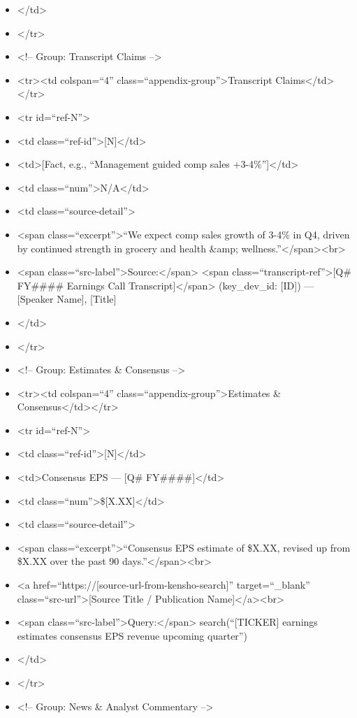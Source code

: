 \documentclass[11pt]{article}
\begin{document}
\begin{itemize}[leftmargin=*,itemsep=2pt,topsep=2pt]
\item {} </td>
\item {} </tr>
\item {} <!-- Group: Transcript Claims -->
\item {} <tr><td colspan=``4'' class=``appendix-group''>Transcript Claims</td></tr>
\item {} <tr id=``ref-N''>
\item {} <td class=``ref-id''>[N]</td>
\item {} <td>[Fact, e.g., ``Management guided comp sales +3-4\%'']</td>
\item {} <td class=``num''>N/A</td>
\item {} <td class=``source-detail''>
\item {} <span class=``excerpt''>``We expect comp sales growth of 3-4\% in Q4, driven by continued strength in grocery and health \&amp; wellness.''</span><br>
\item {} <span class=``src-label''>Source:</span> <span class=``transcript-ref''>[Q\# FY\#\#\#\# Earnings Call Transcript]</span> (key\_\allowbreak{}dev\_\allowbreak{}id: [ID]) — [Speaker Name], [Title]
\item {} </td>
\item {} </tr>
\item {} <!-- Group: Estimates \& Consensus -->
\item {} <tr><td colspan=``4'' class=``appendix-group''>Estimates \& Consensus</td></tr>
\item {} <tr id=``ref-N''>
\item {} <td class=``ref-id''>[N]</td>
\item {} <td>Consensus EPS — [Q\# FY\#\#\#\#]</td>
\item {} <td class=``num''>\$[X.XX]</td>
\item {} <td class=``source-detail''>
\item {} <span class=``excerpt''>``Consensus EPS estimate of \$X.XX, revised up from \$X.XX over the past 90 days.''</span><br>
\item {} <a href=``https://[source-url-from-kensho-search]'' target=``\_\allowbreak{}blank'' class=``src-url''>[Source Title / Publication Name]</a><br>
\item {} <span class=``src-label''>Query:</span> search(``[TICKER] earnings estimates consensus EPS revenue upcoming quarter'')
\item {} </td>
\item {} </tr>
\item {} <!-- Group: News \& Analyst Commentary -->

\end{itemize}
\end{document}

